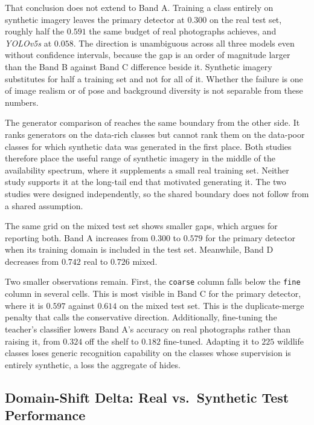 That conclusion does not extend to Band A. Training a class entirely on synthetic imagery leaves the primary detector at $0.300$ on the real test set, roughly half the $0.591$ the same budget of real photographs achieves, and \textit{YOLOv5s} at $0.058$. The direction is unambiguous across all three models even without confidence intervals, because the gap is an order of magnitude larger than the Band B against Band C difference beside it. Synthetic imagery substitutes for half a training set and not for all of it. Whether the failure is one of image realism or of pose and background diversity is not separable from these numbers.

The generator comparison of  reaches the same boundary from the other side. It ranks generators on the data-rich classes but cannot rank them on the data-poor classes for which synthetic data was generated in the first place. Both studies therefore place the useful range of synthetic imagery in the middle of the availability spectrum, where it supplements a small real training set. Neither study supports it at the long-tail end that motivated generating it. The two studies were designed independently, so the shared boundary does not follow from a shared assumption.

The same grid on the mixed test set shows smaller gaps, which argues for reporting both. Band A increases from $0.300$ to $0.579$ for the primary detector when its training domain is included in the test set. Meanwhile, Band D decreases from $0.742$ real to $0.726$ mixed.

Two smaller observations remain. First, the \texttt{coarse} column falls below the \texttt{fine} column in several cells. This is most visible in Band C for the primary detector, where it is $0.597$ against $0.614$ on the mixed test set. This is the duplicate-merge penalty that  calls the conservative direction. Additionally, fine-tuning the teacher's classifier lowers Band A's accuracy on real photographs rather than raising it, from $0.324$ off the shelf to $0.182$ fine-tuned.  %
Adapting it to $225$ wildlife classes loses generic recognition capability on the classes whose supervision is entirely synthetic, a loss the aggregate of  hides.

\subsection{Domain-Shift Delta: Real vs.\ Synthetic Test Performance}\label{sec:results_domain_shift}

